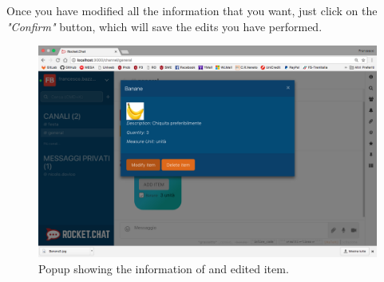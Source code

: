 Once you have modified all the information that you want, just click on the \textit{"Confirm"} button, which will save the edits you have performed.

\begin{figure}[H]
  \centering 
  \includegraphics[width=\textwidth]{Sections/3-HowToUse/Images/item_edited.png}
  \caption{Popup showing the information of and edited item.}
\end{figure}